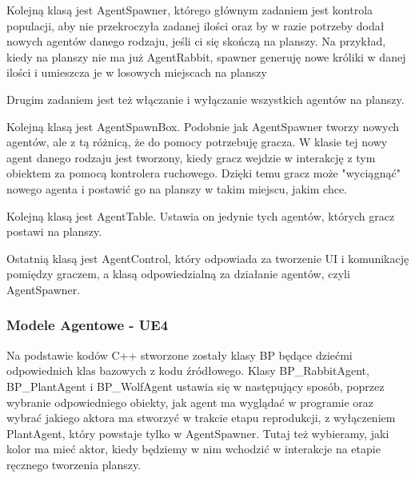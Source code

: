 \documentclass[a4paper,12pt,reqno]{article}
\begin{document}


Kolejną klasą jest AgentSpawner, którego głównym zadaniem jest kontrola populacji, aby nie przekroczyła zadanej ilości oraz by w razie potrzeby dodał nowych agentów danego rodzaju, jeśli ci się skończą na planszy. Na przykład, kiedy na planszy nie ma już AgentRabbit, spawner generuję nowe króliki w danej ilości i umieszcza je w losowych miejscach na planszy


Drugim zadaniem jest też włączanie i wyłączanie wszystkich agentów na planszy.

Kolejną klasą jest AgentSpawnBox. Podobnie jak AgentSpawner tworzy nowych agentów, ale z tą różnicą, że do pomocy potrzebuję gracza. W klasie tej nowy agent danego rodzaju jest tworzony, kiedy gracz wejdzie w interakcję z tym obiektem za pomocą kontrolera ruchowego. Dzięki temu gracz może "wyciągnąć" nowego agenta i postawić go na planszy w takim miejscu, jakim chce.

Kolejną klasą jest AgentTable. Ustawia on jedynie tych agentów, których gracz postawi na planszy.

Ostatnią klasą jest AgentControl, który odpowiada za tworzenie UI i komunikację pomiędzy graczem, a klasą odpowiedzialną za działanie agentów, czyli AgentSpawner.

\subsubsection{Modele Agentowe - UE4}

Na podstawie kodów C++ stworzone zostały klasy BP będące dziećmi odpowiednich klas bazowych z kodu źródłowego. Klasy BP\_RabbitAgent, BP\_PlantAgent i BP\_WolfAgent ustawia się w następujący sposób, poprzez wybranie odpowiedniego obiekty, jak agent ma wyglądać w programie oraz wybrać jakiego aktora ma stworzyć w trakcie etapu reprodukcji, z wyłączeniem PlantAgent, który powstaje tylko w AgentSpawner. Tutaj też wybieramy, jaki kolor ma mieć aktor, kiedy będziemy w nim wchodzić w interakcje na etapie ręcznego tworzenia planszy.
\end{document}
